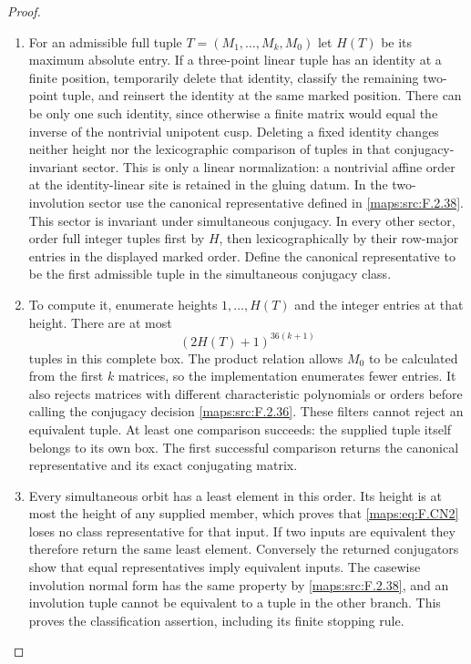 \documentclass[11pt,a4paper]{article}
\theoremstyle{definition}
\begin{document}
\begin{proof}
\begin{enumerate}[label=\arabic*.]
\item For an admissible full tuple $T=(M_1,\ldots,M_k,M_0)$ let
$H(T)$ be its maximum absolute entry. If a three-point linear
tuple has an identity at a finite position, temporarily delete
that identity, classify the remaining two-point tuple, and
reinsert the identity at the same marked position. There can
be only one such identity, since otherwise a finite matrix
would equal the inverse of the nontrivial unipotent cusp.
Deleting a fixed identity changes neither height nor the
lexicographic comparison of tuples in that conjugacy-invariant
sector. This is only a linear normalization: a nontrivial
affine order at the identity-linear site is retained in the
gluing datum. In the two-involution sector use the canonical
representative defined in \ref{maps:src:F.2.38}. This sector is invariant under simultaneous
conjugacy. In every other sector, order full integer tuples
first by $H$, then lexicographically by their row-major
entries in the displayed marked order. Define the canonical
representative to be the first admissible tuple in the
simultaneous conjugacy class.

\item To compute it, enumerate heights $1,\ldots,H(T)$ and the
integer entries at that height. There are at most
\[
                     (2H(T)+1)^{36(k+1)}                  \tag{F.CN2}\label{maps:eq:F.CN2}
\]
tuples in this complete box. The product relation allows
$M_0$ to be calculated from the first $k$ matrices, so the
implementation enumerates fewer entries. It also rejects
matrices with different characteristic polynomials or orders
before calling the conjugacy decision \ref{maps:src:F.2.36}. These filters
cannot reject an equivalent tuple. At least one comparison
succeeds: the supplied tuple itself belongs to its own box.
The first successful comparison returns the canonical
representative and its exact conjugating matrix.

\item Every simultaneous orbit has a least element in this order.
Its height is at most the height of any supplied member,
which proves that \eqref{maps:eq:F.CN2} loses no class representative for
that input. If two inputs are equivalent they therefore
return the same least element. Conversely the returned
conjugators show that equal representatives imply equivalent
inputs. The casewise involution normal form has the same
property by \ref{maps:src:F.2.38}, and an involution tuple cannot be
equivalent to a tuple in the other branch. This proves the
classification assertion, including its finite stopping rule.


\end{enumerate}
\end{proof}
\end{document}
